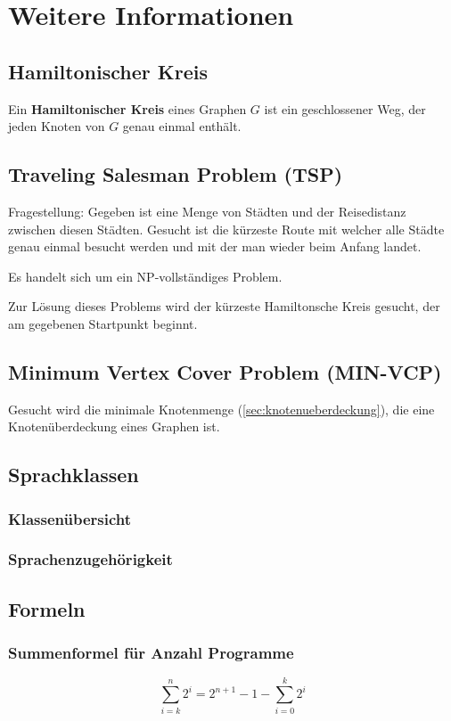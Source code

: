 \chapter{Weitere Informationen}
\section{Hamiltonischer Kreis}
Ein \textbf{Hamiltonischer Kreis} eines Graphen $G$ ist ein geschlossener Weg, der jeden Knoten von $G$ genau einmal enthält.

\section{Traveling Salesman Problem (TSP)}
Fragestellung: Gegeben ist eine Menge von Städten und der Reisedistanz zwischen diesen Städten. Gesucht ist die kürzeste Route mit welcher alle Städte genau einmal besucht werden und mit der man wieder beim Anfang landet.

Es handelt sich um ein NP-vollständiges Problem.

Zur Lösung dieses Problems wird der kürzeste Hamiltonsche Kreis gesucht, der am gegebenen Startpunkt beginnt.

\section{Minimum Vertex Cover Problem (MIN-VCP)}
Gesucht wird die minimale Knotenmenge (\ref{sec:knotenueberdeckung}), die eine Knotenüberdeckung eines Graphen ist.

\section{Sprachklassen}
\subsection{Klassenübersicht}

\subsection{Sprachenzugehörigkeit}

\section{Formeln}
\subsection{Summenformel für Anzahl Programme}
\[
\sum_{i = k}^n 2^i = 2^{n+1} - 1 - \sum_{i = 0}^k 2^i
\]
